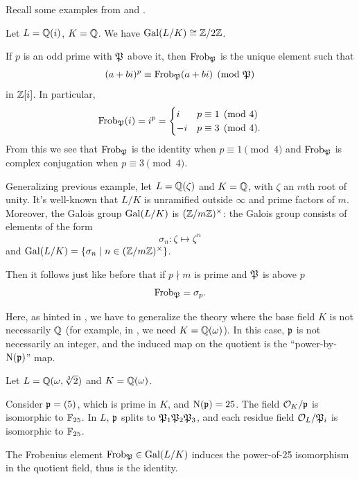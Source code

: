 Recall some examples from  and .
\begin{example}
	Let $L = \mathbb Q(i)$, $K = \mathbb Q$.
	We have $\operatorname{Gal}(L/K) \cong \mathbb Z/2\mathbb Z$.

	If $p$ is an odd prime with $\mathfrak P$ above it,
	then $\mathrm{Frob}_\mathfrak P$ is the unique element such that
	\[ (a+bi)^p \equiv \mathrm{Frob}_\mathfrak P(a+bi) \pmod{\mathfrak P} \]
	in $\mathbb Z[i]$. In particular,
	\[ \mathrm{Frob}_\mathfrak P(i) = i^p =
		\begin{cases}
			i & p \equiv 1 \pmod 4 \\
			-i & p \equiv 3 \pmod 4.
		\end{cases}
	\]
	From this we see that $\mathrm{Frob}_\mathfrak P$ is the identity when $p \equiv 1 \pmod 4$
	and $\mathrm{Frob}_\mathfrak P$ is complex conjugation when $p \equiv 3 \pmod 4$.
\end{example}
\begin{example}
	Generalizing previous example, let $L = \mathbb Q(\zeta)$ and $K = \mathbb Q$,
	with $\zeta$ an $m$th root of unity.
	It's well-known that $L/K$ is unramified outside $\infty$
	and prime factors of $m$.
	Moreover, the Galois group $\operatorname{Gal}(L/K)$ is $(\mathbb Z/m\mathbb Z)^\times$:
	the Galois group consists of elements of the form
	\[ \sigma_n \colon \zeta \mapsto \zeta^n \]
	and $\operatorname{Gal}(L/K) = \left\{ \sigma_n \mid n \in (\mathbb Z/m\mathbb Z)^\times \right\}$.

	Then it follows just like before that
	if $p \nmid m$ is prime and $\mathfrak P$ is above $p$
	\[ \mathrm{Frob}_\mathfrak P = \sigma_p. \]
\end{example}

Here, as hinted in , we have to generalize the
theory where the base field $K$ is not necessarily $\mathbb Q$ (for example, in
, we need $K=\mathbb Q(\omega)$).
In this case, $\mathfrak p$ is
not necessarily an integer, and the induced map on the quotient is the
``power-by-$\operatorname{N}(\mathfrak p)$'' map.

\begin{example}
	Let $L=\mathbb Q(\omega, \sqrt[3]{2})$ and $K=\mathbb Q(\omega)$.

	Consider $\mathfrak p=(5)$, which is prime in $K$, and $\operatorname{N}(\mathfrak p)=25$.
	The field $\mathcal O_K/\mathfrak p$ is isomorphic to $\mathbb F_{25}$.
	In $L$, $\mathfrak p$ splits to $\mathfrak P_1 \mathfrak P_2 \mathfrak P_3$, and each residue field
	$\mathcal O_L/\mathfrak P_i$ is isomorphic to $\mathbb F_{25}$.

	The Frobenius element $\mathrm{Frob}_\mathfrak P \in \operatorname{Gal}(L/K)$ induces the power-of-25
	isomorphism in the quotient field, thus is the identity.
\end{example}


